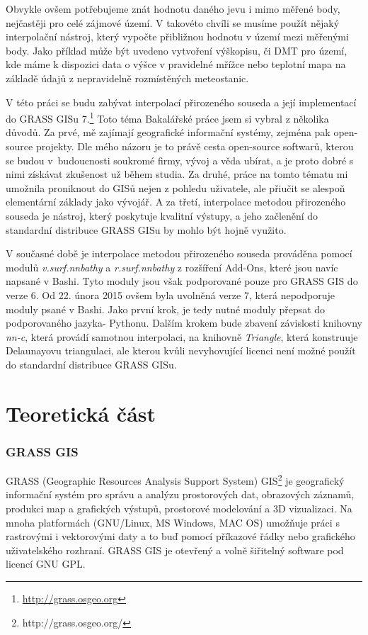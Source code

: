 \documentclass[12pt,a4paper]{article}
\begin{document}
Obvykle ovšem potřebujeme znát hodnotu daného jevu i mimo měřené body, nejčastěji pro celé zájmové území. V takovéto chvíli se musíme použít nějaký interpolační nástroj, který vypočte přibližnou hodnotu v území mezi měřenými body. Jako příklad může být uvedeno vytvoření výškopisu, či DMT pro území, kde máme k dispozici data o výšce v pravidelné mřížce nebo teplotní mapa na základě údajů z nepravidelně rozmístěných meteostanic.

\bigskip
V této práci se budu zabývat interpolací přirozeného souseda a její implementací do GRASS GISu 7.\footnote{\url{http://grass.osgeo.org}} Toto téma Bakalářské práce jsem si vybral z několika důvodů. Za prvé, mě zajímají geografické informační systémy, zejména pak open-source projekty. Dle mého názoru je to právě cesta open-source softwarů, kterou se budou v~budoucnosti soukromé firmy, vývoj a věda ubírat, a je proto dobré s nimi získávat zkušenost už během studia. Za druhé, práce na tomto tématu mi umožnila proniknout do GISů nejen z pohledu uživatele, ale přiučit se alespoň elementární základy jako vývojář. A za třetí, interpolace metodou přirozeného souseda je nástroj, který poskytuje kvalitní výstupy, a jeho začlenění do standardní distribuce GRASS GISu by mohlo být hojně využito.

V současné době je interpolace metodou přirozeného souseda prováděna pomocí modulů \emph{v.surf.nnbathy} a \emph{r.surf.nnbathy} z rozšíření Add-Ons, které jsou navíc napsané v Bashi. Tyto moduly jsou však podporované pouze pro GRASS GIS do verze 6. Od 22. února 2015 ovšem byla uvolněná verze 7, která nepodporuje moduly psané v Bashi. Jako první krok, je tedy nutné moduly přepsat do podporovaného jazyka- Pythonu. Dalším krokem bude zbavení závislosti knihovny \emph{nn-c}, která provádí samotnou interpolaci, na knihovně \emph{Triangle}, která konstruuje Delaunayovu triangulaci, ale kterou kvůli nevyhovující licenci není možné použít do standardní distribuce GRASS GISu.

\newpage
\part{Teoretická část}

\newpage
\section{GRASS GIS}
GRASS (Geographic Resources Analysis Support System) GIS\footnote{http://grass.osgeo.org/} je geografický informační systém pro správu a analýzu prostorových dat, obrazových záznamů, produkci map a grafických výstupů, prostorové modelování a 3D vizualizaci. Na mnoha platformách (GNU/Linux, MS Windows, MAC OS) umožňuje práci s rastrovými i vektorovými daty a to buď pomocí příkazové řádky nebo grafického uživatelského rozhraní. GRASS GIS je otevřený a volně šiřitelný software pod licencí GNU GPL.
\end{document}
